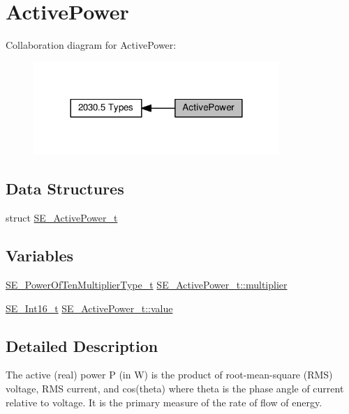 \hypertarget{group__ActivePower}{}\section{Active\+Power}
\label{group__ActivePower}
Collaboration diagram for Active\+Power\+:\nopagebreak
\begin{figure}[H]
\begin{center}
\leavevmode
\includegraphics[width=264pt]{group__ActivePower}
\end{center}
\end{figure}
\subsection*{Data Structures}
\begin{DoxyCompactItemize}
\item 
struct \hyperlink{structSE__ActivePower__t}{S\+E\+\_\+\+Active\+Power\+\_\+t}
\end{DoxyCompactItemize}
\subsection*{Variables}
\begin{DoxyCompactItemize}
\item 
\hyperlink{group__PowerOfTenMultiplierType_gaf0317b781dc8dbb9cb6ac4e44a14fdef}{S\+E\+\_\+\+Power\+Of\+Ten\+Multiplier\+Type\+\_\+t} \hyperlink{group__ActivePower_ga8c107ce3bb523188b57c5e718b56d366}{S\+E\+\_\+\+Active\+Power\+\_\+t\+::multiplier}
\item 
\hyperlink{group__Int16_ga0d600c7df811a7d4b4816e8965877690}{S\+E\+\_\+\+Int16\+\_\+t} \hyperlink{group__ActivePower_ga9dac3ce1ec5e44a9caa1a819582960d2}{S\+E\+\_\+\+Active\+Power\+\_\+t\+::value}
\end{DoxyCompactItemize}


\subsection{Detailed Description}
The active (real) power P (in W) is the product of root-\/mean-\/square (R\+MS) voltage, R\+MS current, and cos(theta) where theta is the phase angle of current relative to voltage. It is the primary measure of the rate of flow of energy. 

